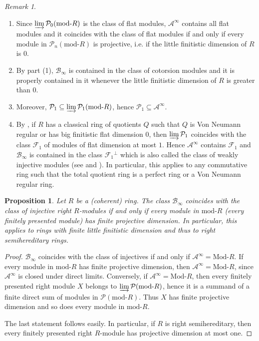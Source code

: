 \documentclass[11pt,a4paper,reqno]{amsart}
\newcommand{\A}{\mathcal{A}}
\newcommand{\B}{\mathcal{B}}
\newcommand{\F}{\mathcal{F}}
\newcommand{\clP}{\mathcal{P}}
\newcommand{\Modr}[1]{\mathrm{Mod}\textrm{-}{#1}}
\newcommand{\modr}[1]{\mathrm{mod}\textrm{-}{#1}}
\theoremstyle{plain}
\newtheorem{prop}[thm]{Proposition}
\theoremstyle{definition}
\theoremstyle{remark}
\newtheorem{rem}[thm]{Remark}
\begin{document}
\begin{rem}\label{R:sup-flat-if-cot} \begin{enumerate}\item Since $\varinjlim \clP_0(\modr R)$ is the class of flat modules, $\A^{\infty}$ contains all flat modules and it coincides with the class of flat modules if and only if every module in $\clP_n(\modr R)$ is projective, i.e. if the little finitistic dimension of $R$ is $0$.
\item By part (1), $\B_{\infty}$ is contained in the class of cotorsion modules and it is properly contained in it whenever the little finitistic dimension of $R$ is greater than $0$.
\item Moreover,  $\clP_1\subseteq \varinjlim \clP_1(\modr R)$, hence $\clP_1\subseteq \A^{\infty}$.
\item By \cite[Theorem 6.7~(vi)]{BH09}, if $R$ has a classical ring of quotients $Q$ such that $Q$ is Von Neumann regular or has big finitistic flat dimension $0$, then $\varinjlim \clP_1$ coincides with the class $\F_1$ of  modules of flat dimension at most $1$.
Hence $\A^{\infty}$ contains $\F_1$ and $ \B_{\infty}$ is contained in the class $\F_1{}^\perp{}$ which is also called the class of weakly injective modules (see \cite{FuLee1} and \cite{FuLee2}).
 In particular, this applies to any commutative ring such that the total quotient ring is a perfect ring or a Von Neumann regular ring.
\end{enumerate}
\end{rem}
%
  \begin{prop}\label{P:semihereditary} Let $R$ be a (coherent) ring. The class $\B_{\infty}$ coincides with the class of injective right  $R$-modules if and only if every module in $\modr R$ (every finitely presented module) has finite projective dimension. In particular, this applies to rings with finite little finitistic dimension and thus to right semihereditary rings.
  \end{prop}

 \begin{proof}  $ \B_{\infty}$ coincides with the class of injectives if and only if $\A^{\infty}=\Modr R$. If every module in $\modr R$  has finite projective dimension, then $\A^{\infty}=\Modr R$, since $\A^{\infty}$ is closed under direct limits. Conversely, if $\A^{\infty}=\Modr R$, then every finitely presented right module $X$ belongs to $\varinjlim \clP(\modr R)$, hence it is a summand of a finite direct sum of modules in $ \clP(\modr R)$. Thus $X$ has finite projective dimension and so does every module in $ \modr R$.

 The last statement follows easily. In particular,  if $R$ is right semihereditary, then every finitely presented right $R$-module has projective dimension at most one.\end{proof}
\end{document}
